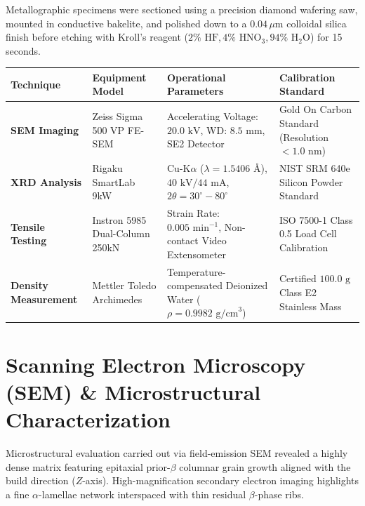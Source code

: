 \documentclass[10pt,a4paper,parskip=half]{scrartcl}
\begin{document}
Metallographic specimens were sectioned using a precision diamond wafering saw, mounted in conductive bakelite, and polished down to a $0.04\,\mu\text{m}$ colloidal silica finish before etching with Kroll's reagent ($2\%\text{ HF}, 4\%\text{ HNO}_3, 94\%\text{ H}_2\text{O}$) for 15 seconds.

\vspace{1mm}
\noindent
{}
\vspace{-1mm}
{\small
\begin{tabularx}{\textwidth}{@{}lYYY@{}}
\toprule
{}
\textbf{Technique} & \textbf{Equipment Model} & \textbf{Operational Parameters} & \textbf{Calibration Standard} \\
\midrule
\textbf{SEM Imaging} & Zeiss Sigma 500 VP FE-SEM & Accelerating Voltage: $20.0\text{ kV}$, WD: $8.5\text{ mm}$, SE2 Detector & Gold On Carbon Standard (Resolution $< 1.0\text{ nm}$) \\
\textbf{XRD Analysis} & Rigaku SmartLab 9kW & Cu-$\text{K}\alpha$ ($\lambda = 1.5406\text{ \AA}$), $40\text{ kV} / 44\text{ mA}$, $2\theta = 30^\circ - 80^\circ$ & NIST SRM 640e Silicon Powder Standard \\
\textbf{Tensile Testing} & Instron 5985 Dual-Column 250kN & Strain Rate: $0.005\text{ min}^{-1}$, Non-contact Video Extensometer & ISO 7500-1 Class 0.5 Load Cell Calibration \\
\textbf{Density Measurement} & Mettler Toledo Archimedes & Temperature-compensated Deionized Water ($\rho = 0.9982\text{ g/cm}^3$) & Certified $100.0\text{ g}$ Class E2 Stainless Mass \\
\bottomrule
\end{tabularx}
}

\vspace{2mm}

\section{Scanning Electron Microscopy (SEM) \& Microstructural Characterization}

Microstructural evaluation carried out via field-emission SEM revealed a highly dense matrix featuring epitaxial prior-$\beta$ columnar grain growth aligned with the build direction ($Z$-axis). High-magnification secondary electron imaging highlights a fine $\alpha$-lamellae network interspaced with thin residual $\beta$-phase ribs.
\end{document}
